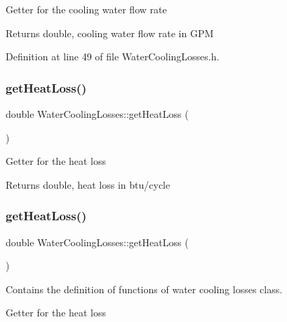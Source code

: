 Getter for the cooling water flow rate

\begin{DoxyReturn}{Returns}
double, cooling water flow rate in G\+PM 
\end{DoxyReturn}


Definition at line 49 of file Water\+Cooling\+Losses.\+h.

\mbox{\label{class_water_cooling_losses_a8f884cc70d7af7add5bb1be7f837384c}} 
\subsubsection{\texorpdfstring{get\+Heat\+Loss()}{getHeatLoss()}\hspace{0.1cm}{\footnotesize\ttfamily [1/3]}}
{\footnotesize\ttfamily double Water\+Cooling\+Losses\+::get\+Heat\+Loss (\begin{DoxyParamCaption}{ }\end{DoxyParamCaption})}

Getter for the heat loss

\begin{DoxyReturn}{Returns}
double, heat loss in btu/cycle 
\end{DoxyReturn}
\mbox{\label{class_water_cooling_losses_a8f884cc70d7af7add5bb1be7f837384c}} 
\subsubsection{\texorpdfstring{get\+Heat\+Loss()}{getHeatLoss()}\hspace{0.1cm}{\footnotesize\ttfamily [2/3]}}
{\footnotesize\ttfamily double Water\+Cooling\+Losses\+::get\+Heat\+Loss (\begin{DoxyParamCaption}{ }\end{DoxyParamCaption})}



Contains the definition of functions of water cooling losses class. 

Getter for the heat loss

